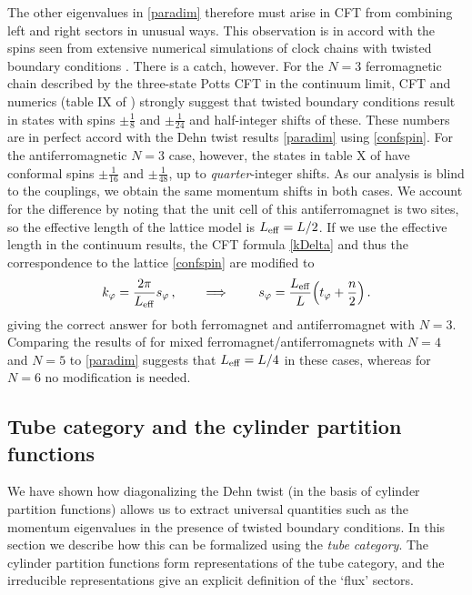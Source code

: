 The other eigenvalues in \eqref{paradim} therefore must arise in CFT from combining left and right sectors in unusual ways. This observation is in accord with the spins seen from extensive numerical simulations of clock chains with twisted boundary conditions \cite{Yu2017}. There is a catch, however. For the $N=3$ ferromagnetic chain described by the three-state Potts CFT in the continuum limit, CFT and numerics (table IX of \cite{Yu2017}) strongly suggest that twisted boundary conditions result in states with spins $\pm \tfrac{1}{8}$ and  $\pm \tfrac{1}{24}$ and half-integer shifts of these. These numbers are in perfect accord with the Dehn twist results \eqref{paradim} using \eqref{confspin}. For the antiferromagnetic $N=3$ case, however, the states in table X of \cite{Yu2017} have conformal spins $\pm \tfrac{1}{16}$ and $\pm \tfrac{1}{48}$, up to {\em quarter}-integer shifts. As our analysis is blind to the couplings, we obtain the same momentum shifts in both cases.  We account for the difference by noting that the unit cell of this antiferromagnet is two sites, so the effective length of the lattice model is $L_{\rm eff}=L/2$. If we use the effective length in the continuum results, the CFT formula \eqref{kDelta} and thus the correspondence to the lattice \eqref{confspin} are modified to
\begin{align} k_\varphi= \frac{2\pi}{L_{\rm eff}} s_\varphi \,,\qquad \implies \qquad
s_\varphi = \frac{L_{\rm eff}}{L} \Big( t_\varphi + \frac{n}{2}\Big) \,.
\label{confspin2}
\end{align}
giving the correct answer for both ferromagnet and antiferromagnet with $N=3$. Comparing the results of \cite{Yu2017} for mixed ferromagnet/antiferromagnets with $N=4$ and $N=5$ to \eqref{paradim} suggests that $L_{\rm eff}=L/4$ in these cases, whereas for $N=6$ no modification is needed. 



\subsection{Tube category and the cylinder partition functions}
\label{sec:tube}

We have shown how diagonalizing the Dehn twist (in the basis of cylinder partition functions) allows us to extract universal quantities such as the momentum eigenvalues in the presence of twisted boundary conditions. 
In this section we describe how this can be formalized using the {\em tube category}.
The cylinder partition functions form representations of the tube category,
and the irreducible representations give an explicit definition of the `flux' sectors.


